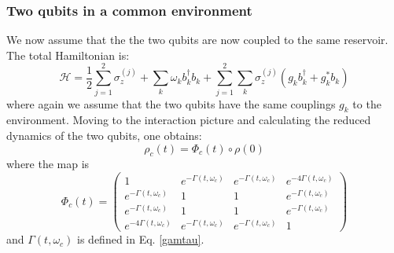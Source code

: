 \documentclass[ pra,a4paper,aps,twocolumn,superscriptaddress]{revtex4-1}
\def\tc#1{{\color{black}#1}}
\begin{document}
\subsubsection{Two qubits in a common environment}
%
 We now assume that the the two qubits are now coupled to the same reservoir. The total Hamiltonian \tc{is}:
\begin{equation}
\mathcal{H}\!= \! \frac12 \! \sum_{j=1}^2 \! \sigma_{z}^{(j)} \! + \!\! \sum_k \! \omega_k b_k^{\dagger}b_k \! + \! \sum_{j=1}^2	 \! \sum_k \! \sigma_{z}^{(j)} \!\! \left(g_k b_k^{\dagger}+g_k^{*}b_k \! \right)
\end{equation}
where again we assume that the two qubits have the same couplings $g_k$ to the environment. Moving to the interaction picture and calculating the reduced dynamics of the two qubits, one obtains:
\begin{equation}
\rho_c(t)=\Phi_c(t)\circ\rho(0)
\end{equation}
where the map is
\tc{\begin{equation}
\! \Phi_{\!c}(t) \! = \! \left( \! \begin{matrix}
1 & e^{-\Gamma(t,\omega_c)}&e^{-\Gamma(t,\omega_c)}&e^{-4\Gamma(t,\omega_c)} \\ e^{-\Gamma(t,\omega_c)} & 1&1&e^{-\Gamma(t,\omega_c)}\\e^{-\Gamma(t,\omega_c)}&1&1&e^{-\Gamma(t,\omega_c)}\\e^{-4\Gamma(t,\omega_c)}&e^{-\Gamma(t,\omega_c)}&e^{-\Gamma(t,\omega_c)}&1 \end{matrix}
\right)
\end{equation}}
and $\Gamma(t,\omega_c)$ is defined in Eq. \eqref{gamtau}.
\end{document}
